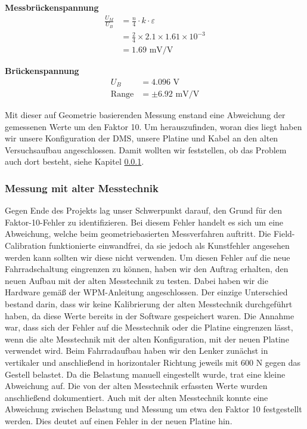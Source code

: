 \textbf{Messbrückenspannung}
\begin{align*}
\frac{U_M}{U_B} &= \frac{n}{4} \cdot k \cdot \varepsilon \\
                &= \frac{2}{4} \times 2.1 \times 1.61 \times 10^{-3} \\
                &= 1.69 \text{ mV/V}
\end{align*}

\textbf {Brückenspannung}
\begin{align*}
U_B &= 4.096 \text{ V} \\
\text{Range} &= \pm 6.92 \text{ mV/V}
\end{align*}


Mit dieser auf Geometrie basierenden Messung enstand eine Abweichung der gemessenen Werte um den Faktor 10.
Um herauszufinden, woran dies liegt haben wir unsere Konfiguration der DMS,
unsere Platine und Kabel an den alten Versuchsaufbau angeschlossen. Damit wollten wir feststellen, ob das Problem auch dort besteht, siehe Kapitel \ref{sec:altetechnik}.




\subsubsection{Messung mit alter Messtechnik}
\label{sec:altetechnik}

Gegen Ende des Projekts lag unser Schwerpunkt darauf, den Grund für den Faktor-10-Fehler zu identifizieren.
Bei diesem Fehler handelt es sich um eine Abweichung, welche beim geometriebasierten Messverfahren auftritt.
Die Field-Calibration funktionierte einwandfrei, da sie jedoch als Kunstfehler angesehen werden kann sollten wir diese nicht verwenden.
Um diesen Fehler auf die neue Fahrradschaltung eingrenzen zu können, haben wir den Auftrag erhalten, den neuen Aufbau mit der alten Messtechnik zu testen.
Dabei haben wir die Hardware gemäß der WPM-Anleitung angeschlossen. Der einzige Unterschied bestand darin, dass wir keine Kalibrierung der alten Messtechnik durchgeführt haben, da diese Werte bereits in der Software gespeichert waren.
Die Annahme war, dass sich der Fehler auf die Messtechnik oder die Platine eingrenzen lässt, wenn die alte Messtechnik mit der alten Konfiguration,
mit der neuen Platine verwendet wird.
Beim Fahrradaufbau haben wir den Lenker zunächst in vertikaler und anschließend in horizontaler Richtung jeweils mit 600 N gegen das Gestell belastet.
Da die Belastung manuell eingestellt wurde, trat eine kleine Abweichung auf. Die von der alten Messtechnik erfassten Werte wurden anschließend dokumentiert.
Auch mit der alten Messtechnik konnte eine Abweichung zwischen Belastung und Messung um etwa den Faktor 10 festgestellt werden.
Dies deutet auf einen Fehler in der neuen Platine hin.

